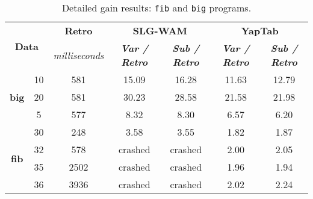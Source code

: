 \begin{table}[ht]
\centering
\footnotesize{
  \begin{tabular}{cc|c|cc|cc}
   \hline
    \hline
    \multicolumn{2}{c|}{\multirow{2}{*}{\small{\textbf{Data}}}} & \textbf{\small{Retro}} & \multicolumn{2}{c|}{\small{\textbf{SLG-WAM}}} & \multicolumn{2}{c}{\small{\textbf{YapTab}}} \\
     \multicolumn{2}{c|}{} & \scriptsize{\textit{milliseconds}} & \textbf{\textit{\scriptsize{Var / Retro}}} & \textbf{\textit{\scriptsize{Sub / Retro}}} & \textbf{\textit{\scriptsize{Var / Retro}}} & \textbf{\textit{\scriptsize{Sub / Retro}}} \\
   \hline
   \hline

   \multirow{3}{*}{\textbf{big}} &  10 &  581 &  15.09  &  16.28  &  11.63 & 12.79 \\
   &  20 &  581 &  30.23  &  28.58  &  21.58 & 21.98 \\
   &  5 &  577 &  8.32  &  8.30  &  6.57 & 6.20 \\
   \hline
   \multirow{4}{*}{\textbf{fib}} &  30 &  248 &  3.58  &  3.55  &  1.82 & 1.87 \\
   &  32 &  578 &  \scriptsize{crashed}  &  \scriptsize{crashed}  &  2.00 & 2.05 \\
   &  35 &  2502 &  \scriptsize{crashed}  &  \scriptsize{crashed}  &  1.96 & 1.94 \\
   &  36 &  3936 &  \scriptsize{crashed}  &  \scriptsize{crashed}  &  2.02 & 2.24 \\
   \hline
\hline
\end{tabular}
}
\caption{Detailed gain results: \texttt{fib} and \texttt{big} programs.}
\label{tbl:results_detail_gain_fib}
\end{table}